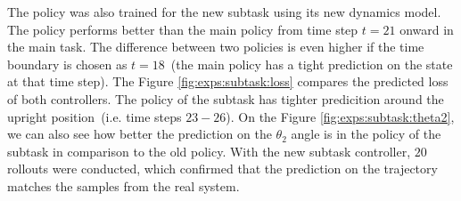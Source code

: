\noindent The policy was also trained for the new subtask using its new dynamics model. The policy performs better than the main policy from time step $t=21$ onward in the main task. The difference between two policies is even higher if the time boundary is chosen as $t=18$\ (the main policy has a tight prediction on the state at that time step). The Figure \ref{fig:exps:subtask:loss} compares the predicted loss of both controllers. The policy of the subtask has tighter predicition around the upright position\ (i.e. time steps $23-26$). On the Figure \ref{fig:exps:subtask:theta2}, we can also see how better the prediction on the $\theta_{2}$ angle is in the policy of the subtask in comparison to the old policy. With the new subtask controller, $20$ rollouts were conducted, which confirmed that the prediction on the trajectory matches the samples from the real system.

\begin{figure}[!ht]
    \centering
    \begin{floatrow}
    \end{floatrow}
\end{figure}


